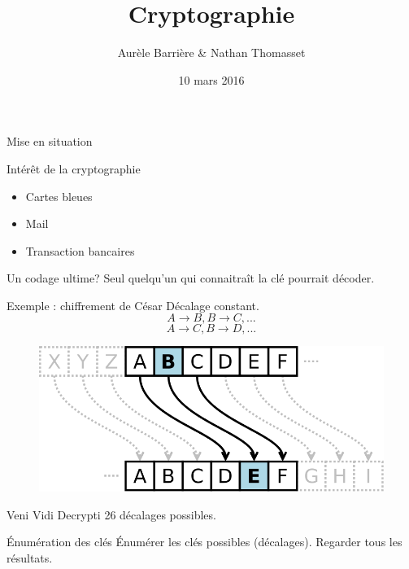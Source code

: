 \documentclass{beamer}
\author{Aurèle Barrière \& Nathan Thomasset}
\title{Cryptographie}
\date{10 mars 2016}
\begin{document}
\begin{frame}
\maketitle
\end{frame}

\begin{frame}{Mise en situation}
  \end{frame}

\begin{frame}{Intérêt de la cryptographie}
  \begin{itemize}
  \item Cartes bleues
    
  \item Mail
    
  \item Transaction bancaires
\end{itemize}
\end{frame}

\begin{frame}{Un codage ultime?}
  Seul quelqu'un qui connaitraît la clé pourrait décoder.
  \end{frame}

\begin{frame}{Exemple : chiffrement de César}
  Décalage constant. 
$$A\rightarrow B, B\rightarrow C, \text{...}$$ 
$$A\rightarrow C, B\rightarrow D, \text{...}$$

  \begin{figure}
    \centering
  \includegraphics[scale = 0.25]{cesar.png}
\end{figure}
\end{frame}

\begin{frame}{Veni Vidi Decrypti}
  26 décalages possibles.
  \end{frame}

\begin{frame}{Énumération des clés}
  Énumérer les clés possibles (décalages). Regarder tous les résultats.
  \end{frame}
\end{document}
